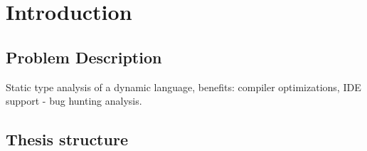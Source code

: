 \chapter{Introduction}

    \section{Problem Description}
    Static type analysis of a dynamic language, benefits: compiler optimizations, IDE support - bug hunting analysis.

    \section{Thesis structure}
